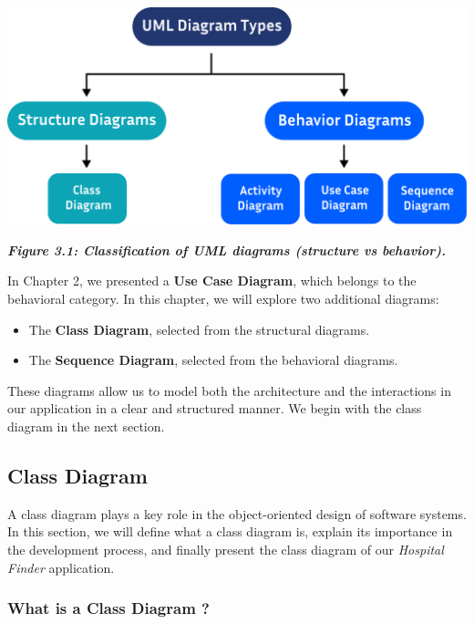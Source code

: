 \documentclass[12pt]{report}
\begin{document}
\begin{center}
	\vspace{1.5cm}
	\hspace{1cm}
	\includegraphics[width=14cm]{images/diagramType.pdf}

\end{center}
\begin{center}
	\textit{\textbf{Figure 3.1: Classification of UML diagrams (structure vs behavior).}}
\end{center}
\vspace{0.5cm}
\noindent In Chapter 2, we presented a \textbf{Use Case Diagram}, which belongs to the behavioral category. In this chapter, we will explore two additional diagrams:
\begin{itemize}
	\item The \textbf{Class Diagram}, selected from the structural diagrams.
	\item The \textbf{Sequence Diagram}, selected from the behavioral diagrams.
\end{itemize}

\noindent These diagrams allow us to model both the architecture and the interactions in our application in a clear and structured manner. We begin with the class diagram in the next section.

\subsection{Class Diagram}

A class diagram plays a key role in the object-oriented design of software systems. In this section, we will define what a class diagram is, explain its importance in the development process, and finally present the class diagram of our \textit{Hospital Finder} application.

\subsubsection{What is a Class Diagram ?}
\vspace{0.1cm}
\end{document}
